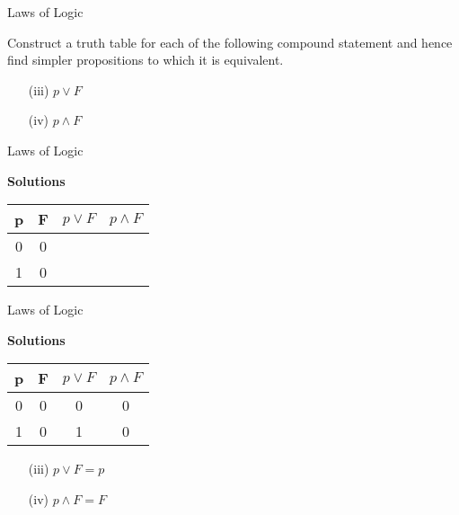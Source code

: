 \documentclass{beamer}
\begin{document}
\begin{frame}

{Laws of Logic}

Construct a truth table for each of the following compound statement and hence find simpler propositions to which it is equivalent.


\begin{itemize}
\item[(iii)] $p \vee F$
\item[(iv)] $p \wedge F$
\end{itemize}
\end{frame}
\begin{frame}
{Laws of Logic}

\textbf{Solutions}
\begin{center}

\begin{tabular}{|c|c||c|c|}
\hline  \phantom{sp}p\phantom{sp}&  \phantom{sp}F\phantom{sp}& $p \vee F$ & $ p \wedge F$ \\ \hline
\hline  0 & 0 &  &  \\ 
\hline  1 &  0 &  &  \\ 
\hline 
\end{tabular} 

\end{center}
\end{frame}
\begin{frame}
{Laws of Logic}

\textbf{Solutions}
\begin{center}
\begin{tabular}{|c|c||c|c|}
\hline  \phantom{sp}p\phantom{sp}&  \phantom{sp}F\phantom{sp}& $p \vee F$ & $ p \wedge F$ \\ \hline
\hline  0 & 0 & 0 & 0 \\ 
\hline  1 &  0 & 1 & 0 \\ 
\hline 
\end{tabular} 

\end{center}
\begin{itemize}
\item[(iii)] $p \vee F = p $
\item[(iv)] $p \wedge F = F $
\end{itemize}
\end{frame}
%
\end{document}

